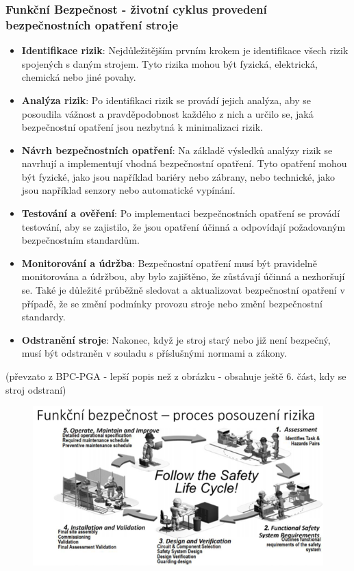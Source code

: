 \subsubsection*{Funkční Bezpečnost - životní cyklus provedení bezpečnostních opatření stroje}
\begin{itemize}
    \item \textbf{Identifikace rizik}: Nejdůležitějším prvním krokem je identifikace všech rizik spojených s daným strojem. Tyto rizika mohou být fyzická, elektrická, chemická nebo jiné povahy.
    \item \textbf{Analýza rizik}: Po identifikaci rizik se provádí jejich analýza, aby se posoudila vážnost a pravděpodobnost každého z nich a určilo se, jaká bezpečnostní opatření jsou nezbytná k minimalizaci rizik.
    \item \textbf{Návrh bezpečnostních opatření}: Na základě výsledků analýzy rizik se navrhují a implementují vhodná bezpečnostní opatření. Tyto opatření mohou být fyzické, jako jsou například bariéry nebo zábrany, nebo technické, jako jsou například senzory nebo automatické vypínání.
    \item \textbf{Testování a ověření}: Po implementaci bezpečnostních opatření se provádí testování, aby se zajistilo, že jsou opatření účinná a odpovídají požadovaným bezpečnostním standardům.
    \item \textbf{Monitorování a údržba}: Bezpečnostní opatření musí být pravidelně monitorována a údržbou, aby bylo zajištěno, že zůstávají účinná a nezhoršují se. Také je důležité průběžně sledovat a aktualizovat bezpečnostní opatření v případě, že se změní podmínky provozu stroje nebo změní bezpečnostní standardy.
    \item \textbf{Odstranění stroje}: Nakonec, když je stroj starý nebo již není bezpečný, musí být odstraněn v souladu s příslušnými normami a zákony.
\end{itemize}
(převzato z BPC-PGA - lepší popis než z obrázku - obsahuje ještě 6. část, kdy se stroj odstraní)

\begin{figure}[h]
    \begin{center}
        \includegraphics[scale = 1]{img/Picture21.png}
    \end{center}
\end{figure}

